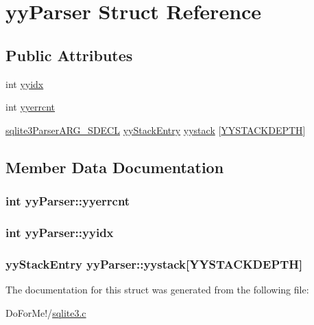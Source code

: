 \hypertarget{structyy_parser}{\section{yy\-Parser Struct Reference}
\label{structyy_parser}
}
\subsection*{Public Attributes}
\begin{DoxyCompactItemize}
\item 
int \hyperlink{structyy_parser_a19abcf4780515fd2debd1ce7a2e29f95}{yyidx}
\item 
int \hyperlink{structyy_parser_ac0350933aa515a3a756dfa742d04ee59}{yyerrcnt}
\item 
\hyperlink{sqlite3_8c_a0053738165ec9f0c84cd1ed2a1d96eaa}{sqlite3\-Parser\-A\-R\-G\-\_\-\-S\-D\-E\-C\-L} \hyperlink{structyy_stack_entry}{yy\-Stack\-Entry} \hyperlink{structyy_parser_ae8bc1531d6ae56020a7ee33a40783672}{yystack} \mbox{[}\hyperlink{sqlite3_8c_ad059052e5b8828cc7d19b4c8494ecb07}{Y\-Y\-S\-T\-A\-C\-K\-D\-E\-P\-T\-H}\mbox{]}
\end{DoxyCompactItemize}


\subsection{Member Data Documentation}
\hypertarget{structyy_parser_ac0350933aa515a3a756dfa742d04ee59}{
\subsubsection[{yyerrcnt}]{\setlength{\rightskip}{0pt plus 5cm}int yy\-Parser\-::yyerrcnt}}\label{structyy_parser_ac0350933aa515a3a756dfa742d04ee59}
\hypertarget{structyy_parser_a19abcf4780515fd2debd1ce7a2e29f95}{
\subsubsection[{yyidx}]{\setlength{\rightskip}{0pt plus 5cm}int yy\-Parser\-::yyidx}}\label{structyy_parser_a19abcf4780515fd2debd1ce7a2e29f95}
\hypertarget{structyy_parser_ae8bc1531d6ae56020a7ee33a40783672}{
\subsubsection[{yystack}]{ {\bf yy\-Stack\-Entry} yy\-Parser\-::yystack\mbox{[}{\bf Y\-Y\-S\-T\-A\-C\-K\-D\-E\-P\-T\-H}\mbox{]}}}\label{structyy_parser_ae8bc1531d6ae56020a7ee33a40783672}


The documentation for this struct was generated from the following file\-:\begin{DoxyCompactItemize}
\item 
Do\-For\-Me!/\hyperlink{sqlite3_8c}{sqlite3.\-c}\end{DoxyCompactItemize}
